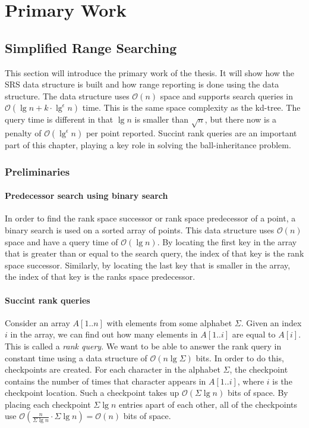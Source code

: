 \chapter{Primary Work}
\label{ch:primarywork}


\section{Simplified Range Searching}

This section will introduce the primary work of the thesis.  It will show how the SRS data structure is built and how range reporting is done using the data structure. The data structure uses $\mathcal{O}(n)$ space and supports search queries in $\mathcal{O}(\lg n + k\cdot \lg^\epsilon n)$ time. This is the same space complexity as the kd-tree. The query time is different in that $\lg n$ is smaller than $\sqrt{n}$, but there now is a penalty of $\mathcal{O}(\lg^\epsilon n)$ per point reported. Succint rank queries are an important part of this chapter, playing a key role in solving the ball-inheritance problem. 


\subsection{Preliminaries}

\subsubsection{Predecessor search using binary search}
In order to find the rank space successor or rank space predecessor of a point, a binary search is used on a sorted array of points. This data structure uses $\mathcal{O}(n)$ space and have a query time of $\mathcal{O}(\lg n)$. By locating the first key in the array that is greater than or equal to the search query, the index of that key is the rank space successor. Similarly, by locating the last key that is smaller in the array, the index of that key is the ranks space predecessor.

\subsubsection{Succint rank queries}
Consider an array $A[1..n]$ with elements from some alphabet $\Sigma$. Given an index $i$ in the array, we can find out how many elements in $A[1..i]$ are equal to $A[i]$. This is called a \emph{rank query}. We want to be able to answer the rank query in constant time using a data structure of $\mathcal{O}(n \lg \Sigma)$ bits. In order to do this, checkpoints are created. For each character in the alphabet $\Sigma$, the checkpoint contains the number of times that character appears in $A[1..i]$, where $i$ is the checkpoint location. Such a checkpoint takes up $\mathcal{O}(\Sigma \lg n)$ bits of space. By placing each checkpoint $\Sigma \lg n$ entries apart of each other, all of the checkpoints use $\mathcal{O}(\frac{n}{\Sigma \lg n} \cdot \Sigma \lg n) = \mathcal{O}(n)$ bits of space.

